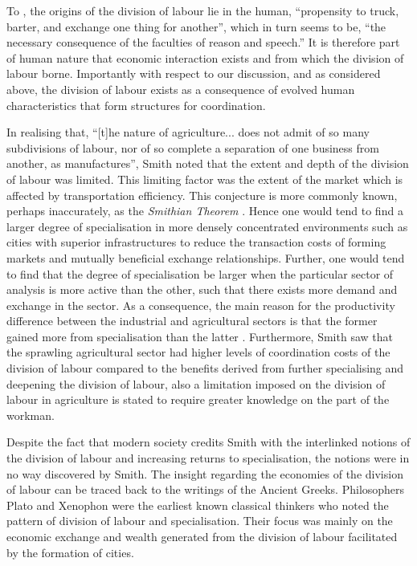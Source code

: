 To \citet[p.~13]{Smith1776}, the origins of the division of labour lie in the human, ``propensity to truck, barter, and exchange one thing for another'', which in turn seems to be, ``the necessary consequence of the faculties of reason and speech.'' It is therefore part of human nature that economic interaction exists and from which the division of labour borne. Importantly with respect to our discussion, and as considered above, the division of labour exists as a consequence of evolved human characteristics that form structures for coordination.

In realising that, ``[t]he nature of agriculture... does not admit of so many subdivisions of labour, nor of so complete a separation of one business from another, as manufactures'', Smith noted that the extent and depth of the division of labour was limited. This limiting factor was the extent of the market which is affected by transportation efficiency. This conjecture is more commonly known, perhaps inaccurately, as the \textit{Smithian Theorem} \citep{Stigler1951}. Hence one would tend to find a larger degree of specialisation in more densely concentrated environments such as cities with superior infrastructures to reduce the transaction costs of forming markets and mutually beneficial exchange relationships. Further, one would tend to find that the degree of specialisation be larger when the particular sector of analysis is more active than the other, such that there exists more demand and exchange in the sector. As a consequence, the main reason for the productivity difference between the industrial and agricultural sectors is that the former gained more from specialisation than the latter \citep[p.~18]{Smith1776}. Furthermore, Smith saw that the sprawling agricultural sector had higher levels of coordination costs of the division of labour compared to the benefits derived from further specialising and deepening the division of labour, also a limitation imposed on the division of labour in agriculture is stated to require greater knowledge on the part of the workman.

\medskip \noindent Despite the fact that modern society credits Smith with the interlinked notions of the division of labour and increasing returns to specialisation, the notions were in no way discovered by Smith. The insight regarding the economies of the division of labour can be traced back to the writings of the Ancient Greeks. Philosophers Plato and Xenophon were the earliest known classical thinkers who noted the pattern of division of labour and specialisation. Their focus was mainly on the economic exchange and wealth generated from the division of labour facilitated by the formation of cities.

